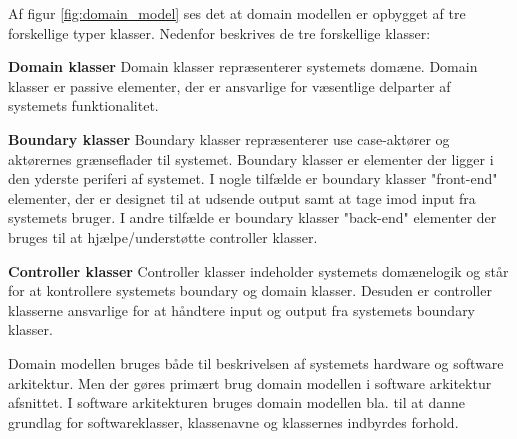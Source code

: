 \newpage

Af figur \ref{fig:domain_model} ses det at domain modellen er opbygget af tre forskellige typer klasser. Nedenfor beskrives de tre forskellige klasser:

\textbf{Domain klasser}\newline
Domain klasser repræsenterer systemets domæne. Domain klasser er passive elementer, der er ansvarlige for væsentlige delparter af systemets funktionalitet.  

\textbf{Boundary klasser}\newline
Boundary klasser repræsenterer use case-aktører og aktørernes grænseflader til systemet. Boundary klasser er elementer der ligger i den yderste periferi af systemet. I nogle tilfælde er boundary klasser "front-end" elementer, der er designet til at udsende output samt at tage imod input fra systemets bruger. I andre tilfælde er boundary klasser "back-end" elementer der bruges til at hjælpe/understøtte controller klasser.

\textbf{Controller klasser} \newline
Controller klasser indeholder systemets domænelogik og står for at kontrollere systemets boundary og domain klasser. Desuden er controller klasserne ansvarlige for at håndtere input og output fra systemets boundary klasser.\\

\vspace{0.5cm}

Domain modellen bruges både til beskrivelsen af systemets hardware og software arkitektur. Men der gøres primært brug domain modellen i software arkitektur afsnittet. I software arkitekturen bruges domain modellen bla. til at danne grundlag for softwareklasser, klassenavne og klassernes indbyrdes forhold.








